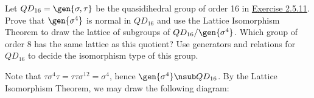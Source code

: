 \begin{problems}
    \item Let $QD_{16} = \gen{\sigma, \tau}$ be the quasidihedral group of order 16 in \hyperref[ex2.5.11]{Exercise 2.5.11}. Prove that $\gen{\sigma^4}$ is normal in $QD_{16}$ and use the Lattice Isomorphism Theorem to draw the lattice of subgroups of $QD_{16}/\gen{\sigma^4}$. Which group of order 8 has the same lattice as this quotient? Use generators and relations for $QD_{16}$ to decide the isomorphism type of this group.
    \begin{sol}
        Note that $\tau\sigma^4\tau = \tau\tau\sigma^{12} = \sigma^4$, hence $\gen{\sigma^4} \nsub QD_{16}$. By the Lattice Isomorphism Theorem, we may draw the following diagram:
        \begin{center}
\end{center}
\end{sol}
\end{problems}
